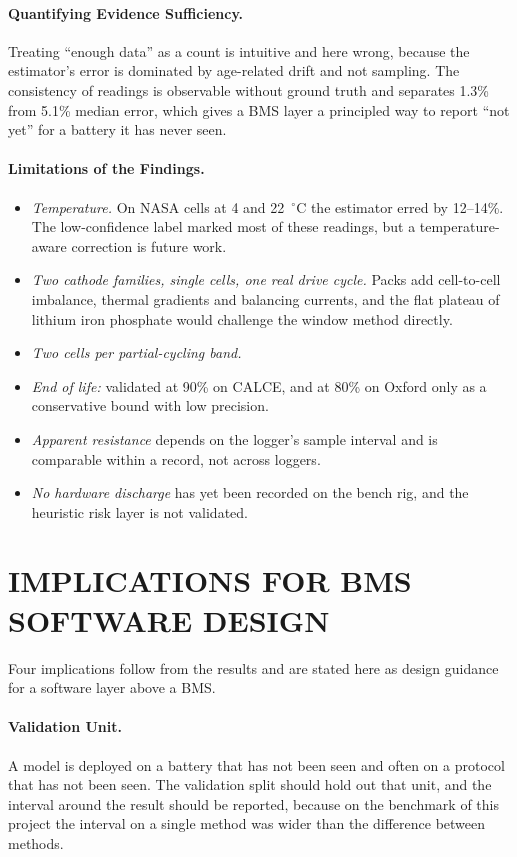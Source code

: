\paragraph{Quantifying Evidence Sufficiency.} Treating ``enough data'' as a count is intuitive and here wrong, because the estimator's error is dominated by age-related drift and not sampling. The consistency of readings is observable without ground truth and separates 1.3\% from 5.1\% median error, which gives a BMS layer a principled way to report ``not yet'' for a battery it has never seen.

\paragraph{Limitations of the Findings.}
\begin{itemize}
    \item \emph{Temperature.} On NASA cells at 4 and 22~$^\circ$C the estimator erred by 12--14\%. The low-confidence label marked most of these readings, but a temperature-aware correction is future work.
    \item \emph{Two cathode families, single cells, one real drive cycle.} Packs add cell-to-cell imbalance, thermal gradients and balancing currents, and the flat plateau of lithium iron phosphate would challenge the window method directly.
    \item \emph{Two cells per partial-cycling band.}
    \item \emph{End of life:} validated at 90\% on CALCE, and at 80\% on Oxford only as a conservative bound with low precision.
    \item \emph{Apparent resistance} depends on the logger's sample interval and is comparable within a record, not across loggers.
    \item \emph{No hardware discharge} has yet been recorded on the bench rig, and the heuristic risk layer is not validated.
\end{itemize}

\section{IMPLICATIONS FOR BMS SOFTWARE DESIGN}

Four implications follow from the results and are stated here as design guidance for a software layer above a BMS.

\paragraph{Validation Unit.} A model is deployed on a battery that has not been seen and often on a protocol that has not been seen. The validation split should hold out that unit, and the interval around the result should be reported, because on the benchmark of this project the interval on a single method was wider than the difference between methods.

